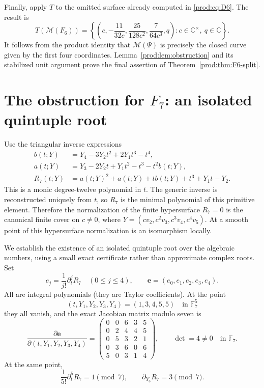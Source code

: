 \documentclass[11pt]{article}
\numberwithin{equation}{section}
\theoremstyle{plain}
\theoremstyle{definition}
\theoremstyle{remark}
\newcommand{\C}{\mathbb{C}}
\newcommand{\Miss}{\mathcal M}
\begin{document}
Finally, apply $T$ to the omitted surface already computed in
\eqref{prod:eq:D6}. The result is
\[
 T(\Miss(F_6))=
 \left\{\left(c,-\frac{11}{32c},\frac{25}{128c^2},
 \frac7{64c^3},q\right):c\in\C^\times,\ q\in\C\right\}.
\]
It follows from the product identity that $\Miss(\Psi)$ is precisely the
closed curve given by the first four coordinates. Lemma~\ref{prod:lem:obstruction}
and its stabilized unit argument prove the final assertion of
Theorem~\ref{prod:thm:F6-split}.

\section{The obstruction for \texorpdfstring{$F_7$}{F7}: an isolated quintuple root}\label{prod:sec:F7}
Use the triangular inverse expressions
\begin{align*}
 b(t;Y)&=Y_4-3Y_2t^2+2Y_1t^3-t^4,\\
 a(t;Y)&=Y_3-2Y_2t+Y_1t^2-t^3-t^2b(t;Y),\\
 R_7(t;Y)&=a(t;Y)^2+a(t;Y)+tb(t;Y)+t^3+Y_1t-Y_2.
\end{align*}
This is a monic degree-twelve polynomial in $t$. The generic inverse is
reconstructed uniquely from $t$, so $R_7$ is the minimal polynomial of
this primitive element. Therefore the normalization of the finite
hypersurface $R_7=0$ is the canonical finite cover on $c\ne0$, where
$Y=(cv_2,c^2v_3,c^3v_4,c^4v_5)$. At a smooth point of this hypersurface
normalization is an isomorphism locally.

We establish the existence of an isolated quintuple root over the algebraic
numbers, using a small exact certificate rather than approximate complex roots.
Set
\[
 e_j=\frac1{j!}\partial_t^jR_7\quad(0\leq j\leq4),\qquad
 \mathbf e=(e_0,e_1,e_2,e_3,e_4).
\]
All are integral polynomials (they are Taylor coefficients).
At the point
\[
 (t,Y_1,Y_2,Y_3,Y_4)=(1,3,4,5,5)\quad\text{in }\mathbb F_7^5
\]
they all vanish, and the exact Jacobian matrix modulo seven is
\begin{equation}\label{prod:eq:F7certificate}
 \frac{\partial\mathbf e}{\partial(t,Y_1,Y_2,Y_3,Y_4)}
 =\begin{pmatrix}
 0&0&6&3&5\\
 0&2&4&4&5\\
 0&5&3&2&1\\
 0&3&6&0&6\\
 5&0&3&1&4
 \end{pmatrix},\qquad\det=4\ne0\quad\text{in }\mathbb F_7.
\end{equation}
At the same point,
\[
 \frac1{5!}\partial_t^5R_7=1\pmod7,\qquad
 \partial_{Y_3}R_7=3\pmod7.
\]
\end{document}
